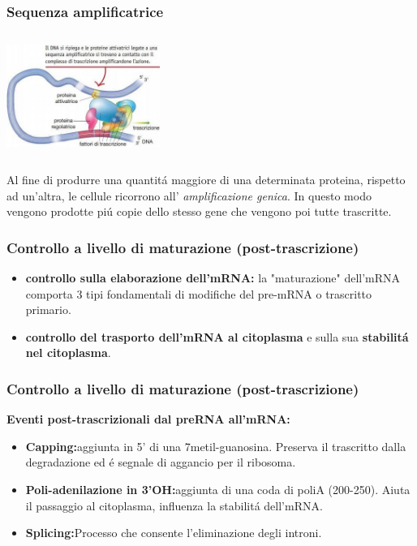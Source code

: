 \documentclass[hyperref={pdfpagelabels=false}]{beamer}
\begin{document}
\begin{frame}\frametitle{Sequenza amplificatrice}
\begin{minipage}[c]{.45\textwidth}
\includegraphics[width=5cm,height=4cm]{proteine.jpg}
\end{minipage}
\begin{minipage}[c]{.5\textwidth}
Al fine di produrre una quantit\'a maggiore di una determinata proteina, rispetto ad un'altra, le cellule ricorrono all' \emph{amplificazione genica}. In questo modo vengono prodotte pi\'u copie dello stesso gene che vengono poi tutte trascritte.
\end{minipage}
\end{frame}

\begin{frame}\frametitle{Controllo a livello di maturazione (post-trascrizione)}
\begin{itemize}
\item \textbf{controllo sulla elaborazione dell'mRNA:} la "maturazione" dell'mRNA comporta 3 tipi fondamentali di modifiche del pre-mRNA o trascritto primario.
\item \textbf{controllo del trasporto dell'mRNA al citoplasma} e sulla sua \textbf{stabilit\'a nel citoplasma}.
\end{itemize}
\end{frame}

\begin{frame}\frametitle{Controllo a livello di maturazione (post-trascrizione)}
\textbf{Eventi post-trascrizionali dal preRNA all'mRNA:}\\
\begin{itemize}
\item \textbf{Capping:}aggiunta in 5' di una 7metil-guanosina. Preserva il trascritto dalla degradazione ed \'e segnale di aggancio per il ribosoma.
\item \textbf{Poli-adenilazione in 3'OH:}aggiunta di una coda di poliA (200-250). Aiuta il passaggio al citoplasma, influenza la stabilit\'a dell'mRNA.
\item \textbf{Splicing:}Processo che consente l'eliminazione degli introni.
\end{itemize}
\end{frame}
\end{document}
